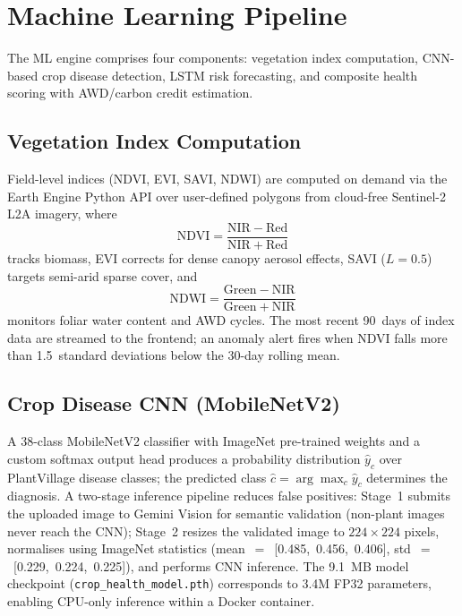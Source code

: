 \documentclass[conference]{IEEEtran}
\begin{document}
\section{Machine Learning Pipeline}
\label{sec:mlpipeline}

The ML engine comprises four components: vegetation index computation, CNN-based crop disease detection, LSTM risk forecasting, and composite health scoring with AWD/carbon credit estimation.

\subsection{Vegetation Index Computation}

Field-level indices (NDVI, EVI, SAVI, NDWI) are computed on demand via the Earth Engine Python API over user-defined polygons from cloud-free Sentinel-2 L2A imagery, where
\begin{equation}
\mathrm{NDVI} = \frac{\mathrm{NIR} - \mathrm{Red}}{\mathrm{NIR} + \mathrm{Red}}
\label{eq:ndvi}
\end{equation}
tracks biomass, EVI corrects for dense canopy aerosol effects, SAVI ($L{=}0.5$) targets semi-arid sparse cover, and
\begin{equation}
\mathrm{NDWI} = \frac{\mathrm{Green} - \mathrm{NIR}}{\mathrm{Green} + \mathrm{NIR}}
\label{eq:ndwi}
\end{equation}
monitors foliar water content and AWD cycles. The most recent 90~days of index data are streamed to the frontend; an anomaly alert fires when NDVI falls more than 1.5~standard deviations below the 30-day rolling mean.

\subsection{Crop Disease CNN (MobileNetV2)}

A 38-class MobileNetV2 classifier with ImageNet pre-trained weights and a custom softmax output head produces a probability distribution $\hat{y}_c$ over PlantVillage disease classes; the predicted class $\hat{c} = \arg\max_c \hat{y}_c$ determines the diagnosis. A two-stage inference pipeline reduces false positives: Stage~1 submits the uploaded image to Gemini Vision for semantic validation (non-plant images never reach the CNN); Stage~2 resizes the validated image to $224\times224$ pixels, normalises using ImageNet statistics (mean~$=$~[0.485,~0.456,~0.406], std~$=$~[0.229,~0.224,~0.225]), and performs CNN inference. The 9.1~MB model checkpoint (\texttt{crop\_health\_model.pth}) corresponds to 3.4M FP32 parameters, enabling CPU-only inference within a Docker container.
\end{document}
